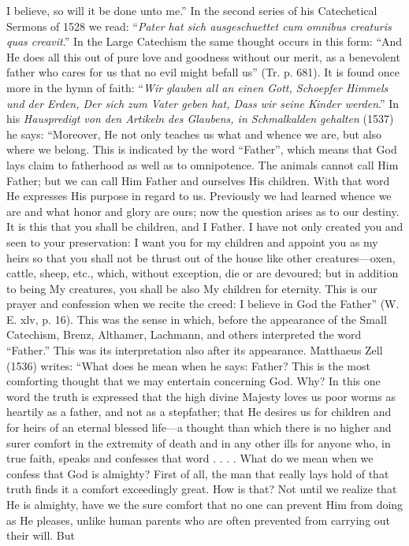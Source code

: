 I believe, so will it be done unto me.” In the second series of his Catechetical Sermons of 1528 we read: “\emph{Pater hat sich ausgeschuettet cum omnibus creaturis quas creavit}.” In the Large Catechism the same thought occurs in this form: “And He does all this out of pure love and goodness without our merit, as a benevolent father who cares for us that no evil might befall us” (Tr. p. 681). It is found once more in the hymn of faith: “\emph{Wir glauben all an einen Gott, Schoepfer Himmels und der Erden, Der sich zum Vater geben hat, Dass wir seine Kinder werden}.” In his \emph{Hauspredigt von den Artikeln des Glaubens, in Schmalkalden gehalten} (1537) he says: “Moreover, He not only teaches us what and whence we are, but also where we belong. This is indicated by the word “Father”, which means that God lays claim to fatherhood as well as to omnipotence. The animals cannot call Him Father; but we can call Him Father and ourselves His children. With that word He expresses His purpose in regard to us. Previously we had learned whence we are and what honor and glory are ours; now the question arises as to our destiny. It is this that you shall be children, and I Father. I have not only created you and seen to your preservation: I want you for my children and appoint you as my heirs so that you shall not be thrust out of the house like other creatures—oxen, cattle, sheep, etc., which, without exception, die or are devoured; but in addition to being My creatures, you shall be also My children for eternity. This is our prayer and confession when we recite the creed: I believe in God the Father” (W. E. xlv, p. 16). This was the sense in which, before the appearance of the Small Catechism, Brenz, Althamer, Lachmann, and others interpreted the word “Father.” This was its interpretation also after its appearance. Matthaeus Zell (1536) writes: “What does he mean when he says: Father? This is the most comforting thought that we may entertain concerning God. Why? In this one word the truth is expressed that the high divine Majesty loves us poor worms as heartily as a father, and not as a stepfather; that He desires us for children and for heirs of an eternal blessed life—a thought than which there is no higher and surer comfort in the extremity of death and in any other ills for anyone who, in true faith, speaks and confesses that word . . . . What do we mean when we confess that God is almighty? First of all, the man that really lays hold of that truth finds it a comfort exceedingly great. How is that? Not until we realize that He is almighty, have we the sure comfort that no one can prevent Him from doing as He pleases, unlike human parents who are often prevented from carrying out their will. But

